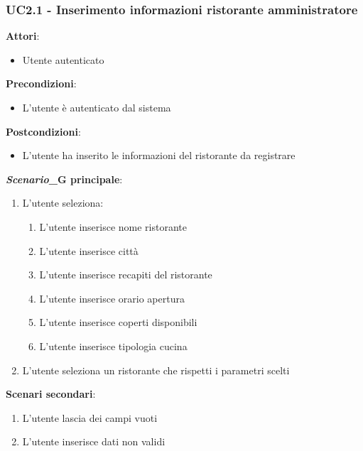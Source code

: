 \subsubsection{UC2.1 - Inserimento informazioni ristorante amministratore}\label{usecase:2_1}
\textbf{Attori}:
\begin{itemize}
    \item Utente autenticato
\end{itemize}
\textbf{Precondizioni}:
\begin{itemize}
    \item L'utente è autenticato dal sistema
\end{itemize}
\textbf{Postcondizioni}:
\begin{itemize}
    \item L'utente ha inserito le informazioni del ristorante da registrare
\end{itemize}
\textbf{\textit{Scenario}_G principale}:
\begin{enumerate}
    \item L'utente seleziona:
    \begin{enumerate}
        \item L'utente inserisce nome ristorante
        \item L'utente inserisce città
        \item L'utente inserisce recapiti del ristorante
        \item L'utente inserisce orario apertura
        \item L'utente inserisce coperti disponibili
        \item L'utente inserisce tipologia cucina
    \end{enumerate}
    \item L'utente seleziona un ristorante che rispetti i parametri scelti
\end{enumerate}
\textbf{Scenari secondari}:
    \begin{enumerate}
        \item L'utente lascia dei campi vuoti
        \item L'utente inserisce dati non validi
    \end{enumerate}
\newpage